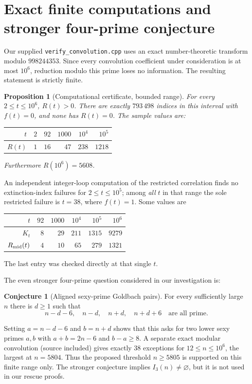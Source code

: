 \documentclass[11pt,a4paper]{article}
\newtheorem{proposition}[theorem]{Proposition}
\theoremstyle{definition}
\newtheorem{conjecture}[theorem]{Conjecture}
\begin{document}
\section{Exact finite computations and stronger four-prime conjecture}

Our supplied \texttt{verify\_convolution.cpp} uses an exact
number-theoretic transform modulo $998244353$. Since every convolution
coefficient under consideration is at most $10^6$, reduction modulo
this prime loses no information. The resulting statement is strictly
finite.

\begin{proposition}[Computational certificate, bounded range]\label{prop:comp}
For every $2\le t\le10^6$, $R(t)>0$. There are exactly
$793\,498$ indices in this interval with $f(t)=0$, and none has
$R(t)=0$. The sample values are:
\begin{center}
\begin{tabular}{@{}rrrrrr@{}}
\toprule
$t$ & $2$ & $92$ & $1000$ & $10^4$ & $10^5$\\
\midrule
$R(t)$ & $1$ & $16$ & $47$ & $238$ & $1218$\\
\bottomrule
\end{tabular}
\end{center}
Furthermore $R(10^6)=5608$.
\end{proposition}

An independent integer-loop computation of the restricted correlation
finds no extinction-index failures for $2\le t\le10^5$; among
\emph{all} $t$ in that range the sole restricted failure is $t=38$,
where $f(t)=1$. Some values are
\begin{center}
\begin{tabular}{@{}rrrrrr@{}}
\toprule
$t$ & $92$ & $1000$ & $10^4$ & $10^5$ & $10^6$\\
\midrule
$K_t$ & $8$ & $29$ & $211$ & $1315$ & $9279$\\
$R_{\rm mid}(t)$ & $4$ & $10$ & $65$ & $279$ & $1321$\\
\bottomrule
\end{tabular}
\end{center}
The last entry was checked directly at that single $t$.

The even stronger four-prime question considered in our investigation is:
\begin{conjecture}[Aligned sexy-prime Goldbach pairs]
For every sufficiently large $n$ there is $d\ge1$ such that
\[
 n-d-6,\quad n-d,\quad n+d,\quad n+d+6
 \quad\text{are all prime}.
\]
\end{conjecture}
Setting $a=n-d-6$ and $b=n+d$ shows that this asks for two
lower sexy primes $a,b$ with $a+b=2n-6$ and $b-a\ge8$.
A separate exact modular convolution (source included) gives
exactly $38$ exceptions for $12\le n\le10^6$, the largest at
$n=5804$. Thus the proposed threshold $n\ge5805$ is supported
on this finite range only.  The stronger conjecture implies
$I_3(n)\ne\varnothing$, but it is not used in our rescue proofs.
\end{document}
